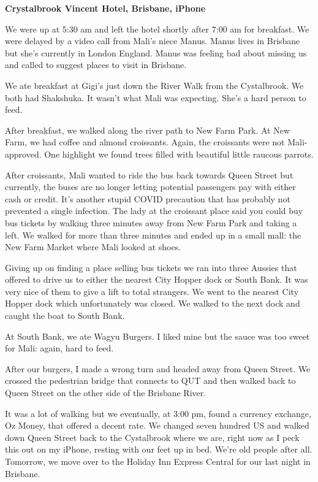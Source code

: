 \textbf{Crystalbrook Vincent Hotel, Brisbane, iPhone}

We were up at 5:30 am and left the hotel shortly after 7:00 am for
breakfast. We were delayed by a video call from Mali's niece Manus.
Manus lives in Brisbane but she's currently in London England. Manus was
feeling bad about missing us and called to suggest places to visit in
Brisbane.

We ate breakfast at Gigi's just down the River Walk from the
Cystalbrook. We both had Shakshuka. It wasn't what Mali was expecting.
She's a hard person to feed.

After breakfast, we walked along the river path to New Farm Park. At New
Farm, we had coffee and almond croissants. Again, the croissants were
not Mali-approved. One highlight we found trees filled with beautiful
little raucous parrots.

After croissants, Mali wanted to ride the bus back towards Queen Street
but currently, the buses are no longer letting potential passengers pay
with either cash or credit. It's another stupid COVID precaution that
has probably not prevented a single infection. The lady at the croissant
place said you could buy bus tickets by walking three minutes away from
New Farm Park and taking a left. We walked for more than three minutes
and ended up in a small mall: the New Farm Market where Mali looked at
shoes.

Giving up on finding a place selling bus tickets we ran into three
Aussies that offered to drive us to either the nearest City Hopper dock
or South Bank. It was very nice of them to give a lift to total
strangers. We went to the nearest City Hopper dock which unfortunately
was closed. We walked to the next dock and caught the boat to South
Bank.

At South Bank, we ate Wagyu Burgers. I liked mine but the sauce was too
sweet for Mali: again, hard to feed.

After our burgers, I made a wrong turn and headed away from Queen
Street. We crossed the pedestrian bridge that connects to QUT and then
walked back to Queen Street on the other side of the Brisbane River.

It was a lot of walking but we eventually, at 3:00 pm, found a currency
exchange, Oz Money, that offered a decent rate. We changed seven hundred
US and walked down Queen Street back to the Cystalbrook where we are,
right now as I peck this out on my iPhone, resting with our feet up in
bed. We're old people after all. Tomorrow, we move over to the Holiday
Inn Express Central for our last night in Brisbane.

